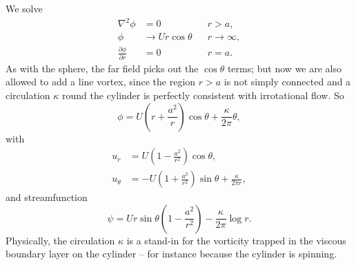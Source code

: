 \documentclass[a4paper]{scrartcl}
\newcommand{\pd}[2]{\frac{\partial #1}{\partial #2}}
\begin{document}
\begin{example} \label{eg:cylinder}
	We solve
	\begin{align*}
		\nabla^2 \phi &= 0 & &r > a,\\
		\phi &\to Ur\cos\theta & &r \to \infty, \\
		\pd{\phi}{r} &= 0 & &r = a.
	\end{align*}
	As with the sphere, the far field picks out the $\cos\theta$ terms; but now we are also allowed to add a line vortex, since the region $r > a$ is not simply connected and a circulation $\kappa$ round the cylinder is perfectly consistent with irrotational flow. So
	$$
	\phi = U\left(r + \frac{a^2}{r}\right)\cos\theta + \frac{\kappa}{2\pi}\theta,
	$$
	with
	\begin{align*}
		u_r &= U\left(1 - \frac{a^2}{r^2}\right)\cos\theta, \\
		u_\theta &= -U\left(1 + \frac{a^2}{r^2}\right)\sin\theta + \frac{\kappa}{2\pi r},
	\end{align*}
	and streamfunction
	$$
	\psi = U r \sin\theta\left(1 - \frac{a^2}{r^2}\right) - \frac{\kappa}{2\pi}\log r.
	$$
	Physically, the circulation $\kappa$ is a stand-in for the vorticity trapped in the viscous boundary layer on the cylinder -- for instance because the cylinder is spinning.


\end{example}
\end{document}
